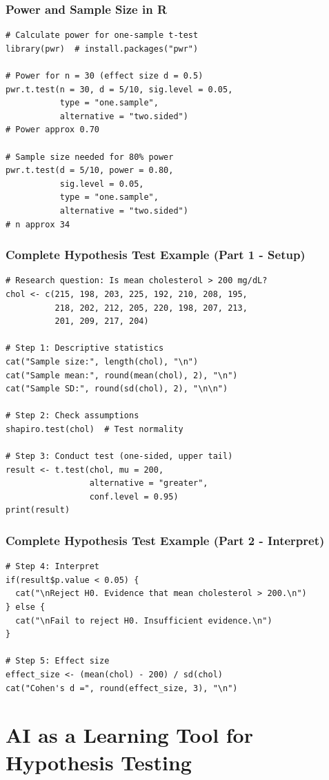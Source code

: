 \documentclass{beamer}
\begin{document}
\begin{frame}[fragile]
\frametitle{Power and Sample Size in R}
\footnotesize
\begin{verbatim}
# Calculate power for one-sample t-test
library(pwr)  # install.packages("pwr")

# Power for n = 30 (effect size d = 0.5)
pwr.t.test(n = 30, d = 5/10, sig.level = 0.05,
           type = "one.sample",
           alternative = "two.sided")
# Power approx 0.70

# Sample size needed for 80% power
pwr.t.test(d = 5/10, power = 0.80,
           sig.level = 0.05,
           type = "one.sample",
           alternative = "two.sided")
# n approx 34
\end{verbatim}
\end{frame}

\begin{frame}[fragile]
\frametitle{Complete Hypothesis Test Example (Part 1 - Setup)}
\tiny
\begin{verbatim}
# Research question: Is mean cholesterol > 200 mg/dL?
chol <- c(215, 198, 203, 225, 192, 210, 208, 195,
          218, 202, 212, 205, 220, 198, 207, 213,
          201, 209, 217, 204)

# Step 1: Descriptive statistics
cat("Sample size:", length(chol), "\n")
cat("Sample mean:", round(mean(chol), 2), "\n")
cat("Sample SD:", round(sd(chol), 2), "\n\n")

# Step 2: Check assumptions
shapiro.test(chol)  # Test normality

# Step 3: Conduct test (one-sided, upper tail)
result <- t.test(chol, mu = 200,
                 alternative = "greater",
                 conf.level = 0.95)
print(result)
\end{verbatim}
\end{frame}

\begin{frame}[fragile]
\frametitle{Complete Hypothesis Test Example (Part 2 - Interpret)}
\small
\begin{verbatim}
# Step 4: Interpret
if(result$p.value < 0.05) {
  cat("\nReject H0. Evidence that mean cholesterol > 200.\n")
} else {
  cat("\nFail to reject H0. Insufficient evidence.\n")
}

# Step 5: Effect size
effect_size <- (mean(chol) - 200) / sd(chol)
cat("Cohen's d =", round(effect_size, 3), "\n")
\end{verbatim}
\end{frame}

\section{AI as a Learning Tool for Hypothesis Testing}
\end{document}
